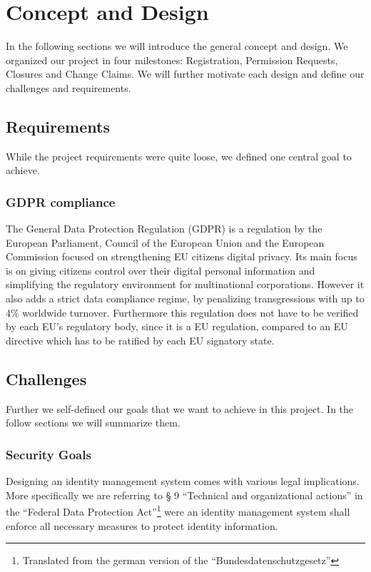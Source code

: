 
\chapter{Concept and Design}
\label{cha:conceptanddesign}
In the following sections we will introduce the general concept and design. We organized our project in four milestones:
Registration, Permission Requests, Closures and Change Claims.
We will further motivate each design and define our challenges and requirements.

\section{Requirements}

While the project requirements were quite loose, we defined one central goal to achieve.

\subsection{GDPR compliance}
\label{subsubsec:GDPR_compliance}
The General Data Protection Regulation (GDPR) is a regulation by the European Parliament, Council of the European Union and the European Commission focused on strengthening EU citizens digital privacy.  Its main focus is on giving citizens control over their digital personal information and simplifying the regulatory environment for multinational corporations. However it also adds a strict data compliance regime, by penalizing transgressions with up to 4\% worldwide turnover\cite{gdpr}. Furthermore this regulation does not have to be verified by each EU's regulatory body, since it is a EU regulation, compared to an EU directive which has to be ratified by each EU signatory state.

\section{Challenges}
\label{sec:challenges}

Further we self-defined our goals that we want to achieve in this project. In the follow sections we will summarize them.

\subsection{Security Goals}
\label{sec:securityGoals}

Designing an identity management system comes with various legal implications. More specifically we are referring to § 9 “Technical and organizational actions” in the “Federal Data Protection Act”\footnote{Translated from the german version of the  “Bundesdatenschutzgesetz”} were an identity management system shall enforce all necessary measures to protect identity information.\cite{bdsg}


